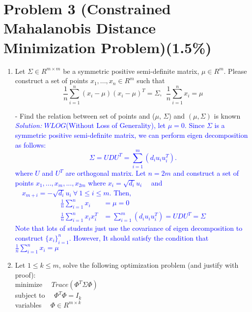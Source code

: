 \documentclass{article}
\def\solColor{blue}
\begin{document}
\section*{Problem 3 (Constrained Mahalanobis Distance Minimization Problem)(1.5\%)}
\begin{enumerate}
    \item Let $\Sigma \in R^{m \times m}$ be a symmetric positive semi-definite matrix, $\mu \in R^m$.  Please construct a set of points $x_1,...,x_n \in R^m$ such that
$$\frac{1}{n}\sum_{i=1}^n (x_i - \mu) (x_i - \mu)^T = \Sigma, ~~ \frac{1}{n}\sum_{i=1}^n x_i = \mu$$

- Find the relation between set of points and ($\mu$, $\Sigma$) and $(\mu, \Sigma)$ is known
\textcolor{\solColor}{\textit{Solution:}
$WLOG$(Without Loss of Generality), let $\mu = 0$. Since $\Sigma$ is a symmetric positive semi-definite matrix, we can perform eigen decomposition as follows:
$$
\Sigma = UDU^T = \sum_{i=1}^m (d_iu_iu_i^T).$$
where $U$ and $U^T$ are orthogonal matrix.
Let $n=2m$ and construct a set of points $x_1, ..., x_m, ..., x_{2m}$
where $x_i = \sqrt{d_i}u_i \quad$ and $\quad x_{m+i} = -\sqrt{d_i}u_i \ \forall\  1\leq i \leq m.$ Then, 
$$
\begin{aligned}
\frac{1}{n}\sum_{i=1}^{n}x_i &= \mu = 0 \\ 
\frac{1}{n}\sum_{i=1}^{n}x_ix_i^T &= \sum_{i=1}^{m}(d_iu_iu_i^T) =UDU^T =  \Sigma
\end{aligned}
$$
Note that lots of students just use the covariance of eigen decomposition to construct $\{x_i\}_{i=1}^n$. However, It should satisfy the condition that $\frac{1}{n}\sum_{i=1}^n x_i = \mu$
}

\item Let $1 \leq k \leq m$, solve the following optimization problem (and justify with proof): \\
minimize  $\quad Trace(\Phi^T \Sigma \Phi)$ \\ 
subject to $\quad \Phi^T \Phi = I_k$ \\
variables $\quad \Phi \in R^{m \times k}$
\end{enumerate}
\end{document}
